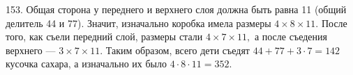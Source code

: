 153. Общая сторона у переднего и верхнего слоя должна быть равна 11 (общий делитель 44 и 77). Значит, изначально коробка имела размеры $4\times8\times11.$ После того, как съели передний слой, размеры стали $4\times7\times11,$ а после съедения верхнего --- $3\times7\times11.$ Таким образом, всего дети съедят $44+77+3\cdot7=142$ кусочка сахара, а изначально их было $4\cdot8\cdot11=352.$\\
